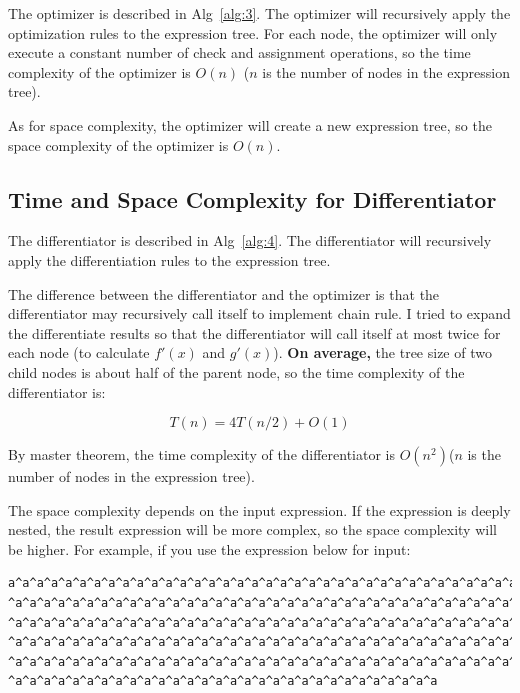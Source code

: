 \documentclass[a4paper,oneside]{book}
\begin{document}
The optimizer is described in Alg~\ref{alg:3}. The optimizer will recursively apply the optimization rules to the expression tree. For each node, the optimizer will only execute a constant number of check and assignment operations, so the time complexity of the optimizer is $O(n)$ ($n$ is the number of nodes in the expression tree).

As for space complexity, the optimizer will create a new expression tree, so the space complexity of the optimizer is $O(n)$.

\subsection{Time and Space Complexity for Differentiator}

The differentiator is described in Alg~\ref{alg:4}. The differentiator will recursively apply the differentiation rules to the expression tree.

The difference between the differentiator and the optimizer is that the differentiator may recursively call itself to implement chain rule. I tried to expand the differentiate results so that the differentiator will call itself at most twice for each node (to calculate $f'(x)$ and $g'(x)$). \textbf{On average,} the tree size of two child nodes is about half of the parent node, so the time complexity of the differentiator is:

\begin{displaymath}
    T(n) = 4T(n/2) + O(1)
\end{displaymath}

By master theorem, the time complexity of the differentiator is $O(n^2)$($n$ is the number of nodes in the expression tree).

The space complexity depends on the input expression. If the expression is deeply nested, the result expression will be more complex, so the space complexity will be higher. For example, if you use the expression below for input:

\begin{verbatim}
a^a^a^a^a^a^a^a^a^a^a^a^a^a^a^a^a^a^a^a^a^a^a^a^a^a^a^a^a^a^a^a^a^a^a^a^a^a^a^a^a^a^a^a^a^a
^a^a^a^a^a^a^a^a^a^a^a^a^a^a^a^a^a^a^a^a^a^a^a^a^a^a^a^a^a^a^a^a^a^a^a^a^a^a^a^a^a^a^a^a^a
^a^a^a^a^a^a^a^a^a^a^a^a^a^a^a^a^a^a^a^a^a^a^a^a^a^a^a^a^a^a^a^a^a^a^a^a^a^a^a^a^a^a^a^a^a
^a^a^a^a^a^a^a^a^a^a^a^a^a^a^a^a^a^a^a^a^a^a^a^a^a^a^a^a^a^a^a^a^a^a^a^a^a^a^a^a^a^a^a^a^a
^a^a^a^a^a^a^a^a^a^a^a^a^a^a^a^a^a^a^a^a^a^a^a^a^a^a^a^a^a^a^a^a^a^a^a^a^a^a^a^a^a^a^a^a^a
^a^a^a^a^a^a^a^a^a^a^a^a^a^a^a^a^a^a^a^a^a^a^a^a^a^a^a^a^a^a
\end{verbatim}
\end{document}
